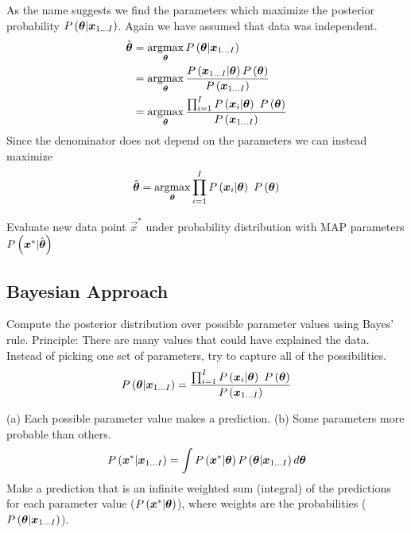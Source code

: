 \begin{description}[leftmargin=0cm]
\item[Fitting] As the name suggests we find the parameters which maximize the posterior probability $P\left(\boldsymbol{\theta}|\boldsymbol{x}_{1\dots I}\right)$. Again we have assumed that data was independent.
	\begin{align*}
	\hat{\vec{\th}}&=\argmax_{\vec{\th}}\P{\vec{\th}|\vec{x}_{1\dots I}} \\
	&=\argmax_{\vec{\th}}\frac{\P{\vec{x}_{1\dots I}|\vec{\th}}\P{\vec{\th}}}{\P{\vec{x}_{1\dots I}}} \\
	&=\argmax_{\vec{\th}}\frac{\prod_{i=1}^I\P{\vec{x}_i|\vec{\th}}\ \P{\vec{\th}}}{\P{\vec{x}_{1\dots I}}}
	\end{align*}
Since the denominator does not depend on the parameters we can instead maximize
	\begin{align*}
	\hat{\vec{\th}}=\argmax_{\vec{\th}}\prod_{i=1}^I\P{\vec{x}_i|\vec{\th}}\ \P{\vec{\th}}
	\end{align*}
\item[Predictive Density] Evaluate new data point $\vec{x}^*$ under probability distribution with MAP parameters $P\left(\boldsymbol{x}^*|\hat{\boldsymbol{\theta}}\right)$
\end{description}

\subsection{Bayesian Approach}

\begin{description}[leftmargin=0cm]
\item[Fitting] Compute the posterior distribution over possible parameter values using Bayes' rule. Principle: There are many values that could have explained the data. Instead of picking one set of parameters, try to capture all of the possibilities.
	\begin{align*}
	\P{\vec{\th}|\vec{x}_{1\dots I}}=\frac{\prod_{i=1}^I\P{\vec{x}_i|\vec{\th}}\ \P{\vec{\th}}}{\P{\vec{x}_{1\dots I}}}
	\end{align*}
\item[Predictive Density] (a) Each possible parameter value makes a prediction. (b) Some parameters more probable than others.
	\begin{align*}
	P\left(\boldsymbol{x}^*|\boldsymbol{x}_{1\dots I}\right)=\int P\left(\boldsymbol{x}^*|\boldsymbol{\theta}\right)P\left(\boldsymbol{\theta}|\boldsymbol{x}_{1\dots I}\right)d\boldsymbol{\theta}
	\end{align*}
Make a prediction that is an infinite weighted sum (integral) of the predictions for each parameter value ($P\left(\boldsymbol{x}^*|\boldsymbol{\theta}\right)$), where weights are the probabilities ($P\left(\boldsymbol{\theta}|\boldsymbol{x}_{1\dots I}\right)$).
\end{description}

